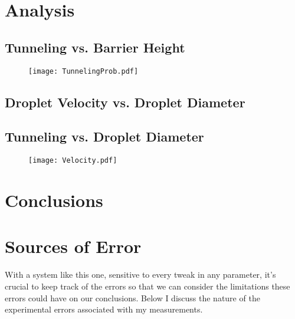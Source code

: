 \section{Analysis}

    \subsection{Tunneling vs. Barrier Height}
    
\begin{figure}[h!]
	\centering
	\texttt{[image: TunnelingProb.pdf]}
	\caption{}
	\label{tbh}
\end{figure}

    \subsection{Droplet Velocity vs. Droplet Diameter}

    \subsection{Tunneling vs. Droplet Diameter}
\begin{figure}[h!]
	\centering
	\texttt{[image: Velocity.pdf]}
	\caption{}
	\label{vel}
\end{figure}


\section{Conclusions}


\section{Sources of Error}

    With a system like this one, sensitive to every tweak in any parameter, it's crucial to keep track of the errors so that we can consider the limitations these errors could have on our conclusions. Below I discuss the nature of the experimental errors associated with my measurements.
       
